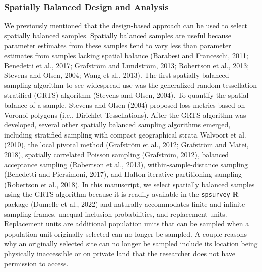 \documentclass[]{elsarticle} %
\begin{document}
\hypertarget{subsec:spb_design}{%
\subsubsection{Spatially Balanced Design and
Analysis}\label{subsec:spb_design}}

We previously mentioned that the design-based approach can be used to
select spatially balanced samples. Spatially balanced samples are useful
because parameter estimates from these samples tend to vary less than
parameter estimates from samples lacking spatial balance (Barabesi and
Franceschi, 2011; Benedetti et al., 2017; Grafström and Lundström, 2013;
Robertson et al., 2013; Stevens and Olsen, 2004; Wang et al., 2013). The
first spatially balanced sampling algorithm to see widespread use was
the generalized random tessellation stratified (GRTS) algorithm (Stevens
and Olsen, 2004). To quantify the spatial balance of a sample, Stevens
and Olsen (2004) proposed loss metrics based on Voronoi polygons (i.e.,
Dirichlet Tessellations). After the GRTS algorithm was developed,
several other spatially balanced sampling algorithms emerged, including
stratified sampling with compact geographical strata Walvoort et al.
(2010), the local pivotal method (Grafström et al., 2012; Grafström and
Matei, 2018), spatially correlated Poisson sampling (Grafström, 2012),
balanced acceptance sampling (Robertson et al., 2013),
within-sample-distance sampling (Benedetti and Piersimoni, 2017), and
Halton iterative partitioning sampling (Robertson et al., 2018). In this
manuscript, we select spatially balanced samples using the GRTS
algorithm because it is readily available in the \texttt{spsurvey}
\textbf{\textsf{R}} package (Dumelle et al., 2022) and naturally
accommodates finite and infinite sampling frames, unequal inclusion
probabilities, and replacement units. Replacement units are additional
population units that can be sampled when a population unit originally
selected can no longer be sampled. A couple reasons why an originally
selected site can no longer be sampled include its location being
physically inaccessible or on private land that the researcher does not
have permission to access.
\end{document}
